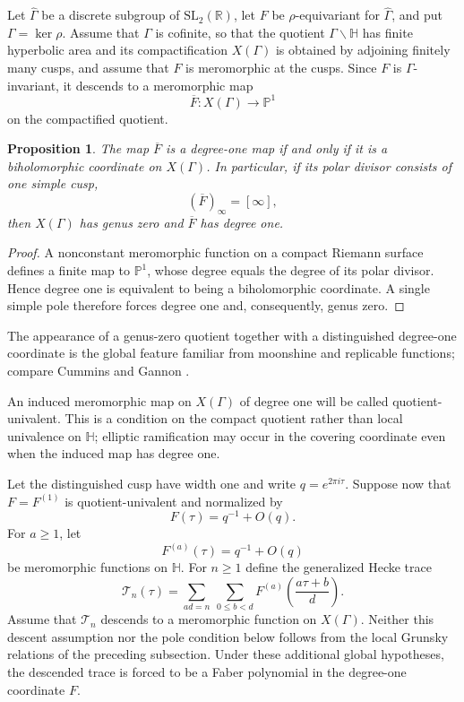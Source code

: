 \documentclass[11pt]{amsart}
\newtheorem{prop}[thm]{Proposition}
\theoremstyle{definition}
\theoremstyle{remark}
\numberwithin{equation}{section}
\begin{document}
Let $\widehat\Gamma$ be a discrete subgroup of $\mathrm{SL}_2(\mathbb R)$, let $F$ be $\rho$-equivariant for $\widehat\Gamma$, and put $\Gamma=\ker\rho$. Assume that \(\Gamma\) is cofinite, so that the quotient \(\Gamma\backslash\mathbb H\) has finite hyperbolic area and its compactification \(X(\Gamma)\) is obtained by adjoining finitely many cusps, and assume that $F$ is meromorphic at the cusps. Since $F$ is $\Gamma$-invariant, it descends to a meromorphic map
\[
\overline F:X(\Gamma)\longrightarrow\mathbb P^1
\]
on the compactified quotient.

\begin{prop}\label{prop:degree-one-quotient}
The map $\overline F$ is a degree-one map if and only if it is a biholomorphic coordinate on $X(\Gamma)$. In particular, if its polar divisor consists of one simple cusp,
\[
(\overline F)_\infty=[\infty],
\]
then $X(\Gamma)$ has genus zero and $\overline F$ has degree one.
\end{prop}

\begin{proof}
A nonconstant meromorphic function on a compact Riemann surface defines a finite map to \(\mathbb P^1\), whose degree equals the degree of its polar divisor. Hence degree one is equivalent to being a biholomorphic coordinate. A single simple pole therefore forces degree one and, consequently, genus zero.
\end{proof}
The appearance of a genus-zero quotient together with a distinguished degree-one coordinate is the global feature familiar from moonshine and replicable functions; compare Cummins and Gannon \cite{cummins-gannon}.

An induced meromorphic map on \(X(\Gamma)\) of degree one will be called quotient-univalent. This is a condition on the compact quotient rather than local univalence on $\mathbb H$; elliptic ramification may occur in the covering coordinate even when the induced map has degree one.

Let the distinguished cusp have width one and write $q=e^{2\pi i\tau}$. Suppose now that $F=F^{(1)}$ is quotient-univalent and normalized by
\[
F(\tau)=q^{-1}+O(q).
\]
For $a\geq1$, let
\[
F^{(a)}(\tau)=q^{-1}+O(q)
\]
be meromorphic functions on $\mathbb H$. For $n\geq1$ define the generalized Hecke trace
\begin{equation*}
\mathcal T_n(\tau)
=
\sum_{ad=n}\ \sum_{0\leq b<d}
F^{(a)}\!\left(\frac{a\tau+b}{d}\right).
\end{equation*}
Assume that $\mathcal T_n$ descends to a meromorphic function on $X(\Gamma)$. Neither this descent assumption nor the pole condition below follows from the local Grunsky relations of the preceding subsection. Under these additional global hypotheses, the descended trace is forced to be a Faber polynomial in the degree-one coordinate $F$.
\end{document}
